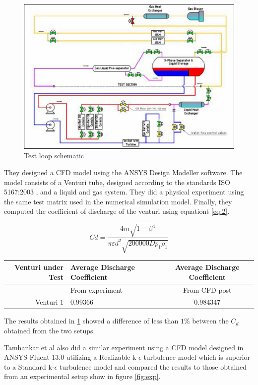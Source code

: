 \begin{figure}[ht]
\includegraphics[width=0.9\linewidth]{Figures/test_loop.png}
\centering
\caption{ Test loop schematic \cite{tukimin2016cfd}}
\label{fig:test_loop_rig}
\end{figure}

They designed a CFD model using the ANSYS Design Modeller software. The model consists of a Venturi tube, designed according to the standards ISO 5167:2003 \cite{iso20035167}, and a liquid and gas system. They did a physical experiment using the same test matrix used in the numerical simulation model. Finally, they computed the coefficient of discharge of the venturi using equationt \ref{eq:2}.  

\begin{equation}
C d=\frac{4 m \sqrt{1-\beta^{4}}}{\pi \varepsilon d^{2} \sqrt{200000 D p_{1} \rho_{1}}}
\label{eq:2}
\end{equation}

\begin{table}[!t]
  \begin{center}
    \leavevmode
     \begin{tabular}{rlc}\hline
      Venturi under Test & Average Discharge Coefficient &  Average Discharge Coefficient \\ \hline
       & From experiment &  From CFD post \\ \hline
      Venturi 1 & 0.99366 &  0.984347 \\ \hline
    \end{tabular}
    \label{tab:cd}
  \end{center}
\end{table}
The results obtained in \ref{tab:cd} showed a difference of less than $1 \%$ between the $C_{d}$ obtained from the two setups.
\par
Tamhankar et al \cite{tamhankar2014experimental} also did a similar experiment using a CFD model designed in ANSYS Fluent 13.0 utilizing a Realizable k-$\epsilon$ turbulence model which is superior to a Standard k-$\epsilon$ turbulence model and compared the results to those obtained from an experimental setup show in figure \ref{fig:exp}. 

